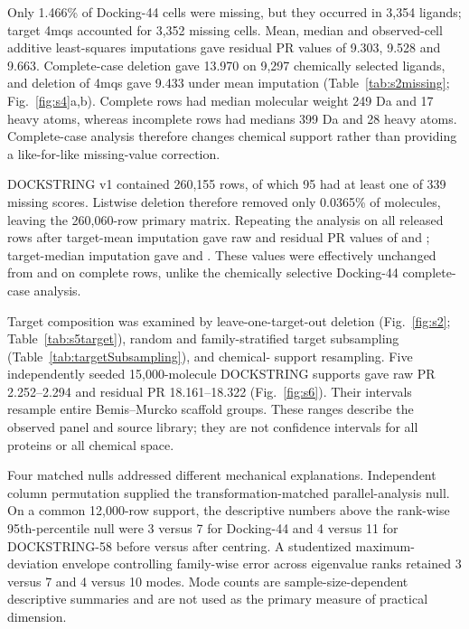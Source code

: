 \documentclass[11pt]{article}
\begin{document}
Only 1.466\% of Docking-44 cells were missing, but they occurred in 3,354 ligands; target
4mqs accounted for 3,352 missing cells. Mean, median and observed-cell additive
least-squares imputations gave residual PR values of 9.303, 9.528 and 9.663. Complete-case
deletion gave 13.970 on 9,297 chemically selected ligands, and deletion of 4mqs gave 9.433
under mean imputation (Table~\ref{tab:s2missing}; Fig.~\ref{fig:s4}a,b). Complete rows had
median molecular weight 249 Da and 17 heavy atoms, whereas incomplete rows had medians 399
Da and 28 heavy atoms. Complete-case analysis therefore changes chemical support rather than
providing a like-for-like missing-value correction.

DOCKSTRING v1 contained 260,155 rows, of which 95 had at least one of 339 missing
scores. Listwise deletion therefore removed only 0.0365\% of molecules, leaving the
260,060-row primary matrix. Repeating the analysis on all released rows after target-mean
imputation gave raw and residual PR values of \DsMeanImputedRawPR{} and
\DsMeanImputedResidualPR{}; target-median imputation gave \DsMedianImputedRawPR{} and
\DsMedianImputedResidualPR{}. These values were effectively unchanged from
\DsRawPR{} and \DsResidualPR{} on complete rows, unlike the chemically selective
Docking-44 complete-case analysis.

Target composition was examined by leave-one-target-out deletion (Fig.~\ref{fig:s2};
Table~\ref{tab:s5target}), random and family-stratified target subsampling
(Table~\ref{tab:targetSubsampling}), and chemical-
support resampling. Five independently seeded 15,000-molecule DOCKSTRING supports gave raw
PR 2.252--2.294 and residual PR 18.161--18.322 (Fig.~\ref{fig:s6}). Their intervals resample
entire Bemis--Murcko scaffold groups. These ranges describe the observed panel and source
library; they are not confidence intervals for all proteins or all chemical space.

Four matched nulls addressed different mechanical explanations. Independent column
permutation supplied the transformation-matched parallel-analysis null. On a common
12,000-row support, the descriptive numbers above the rank-wise 95th-percentile null were
3 versus 7 for Docking-44 and 4 versus 11 for DOCKSTRING-58 before versus after centring. A
studentized maximum-deviation envelope controlling family-wise error across eigenvalue ranks
retained 3 versus 7 and 4 versus 10 modes. Mode counts are sample-size-dependent descriptive
summaries and are not used as the primary measure of practical dimension.
\end{document}
